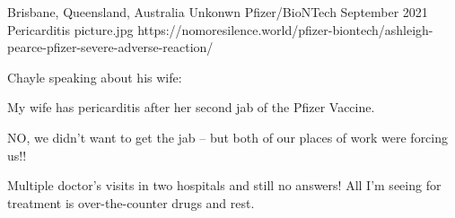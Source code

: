 {Brisbane, Queensland, Australia}
{Unkonwn}
{Pfizer/BioNTech}
{September 2021}
{Pericarditis}
{picture.jpg}
{https://nomoresilence.world/pfizer-biontech/ashleigh-pearce-pfizer-severe-adverse-reaction/}
{

Chayle speaking about his wife:

My wife has pericarditis after her second jab of the Pfizer Vaccine.

NO, we didn’t want to get the jab – but both of our places of work were forcing
us!!

Multiple doctor’s visits in two hospitals and still no answers! All I’m seeing
for treatment is over-the-counter drugs and rest.

}
